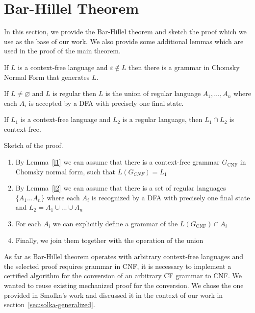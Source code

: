 \section{Bar-Hillel Theorem}
\label{sec:b-h-th}

In this section, we provide the Bar-Hillel theorem and sketch the proof which we use as the base of our work.
We also provide some additional lemmas which are used in the proof of the main theorem.

\begin{lemma} \label{l1}
	If $L$ is a context-free language and $\varepsilon \notin L$ then there is a grammar in Chomsky Normal Form that generates $L$.
\end{lemma}

\begin{lemma} \label{l2}
	If $ L \neq \varnothing $ and $L$ is regular then $L$ is the union of regular language $A_1, \ldots , A_n$ where each $A_i$ is accepted by a DFA with precisely one final state.
\end{lemma}

\begin{theorem}
	If $L_1$ is a context-free language and $L_2$ is a regular language, then $L_1 \cap L_2$ is context-free.
\end{theorem}


Sketch of the proof.
\begin{enumerate}
	\item By Lemma~\ref{l1} we can assume that there is a context-free grammar $G_{\text{CNF}}$ in Chomsky normal form, such that $L(G_{CNF}) = L_1$
	\item By Lemma~\ref{l2} we can assume that there is a set of regular languages $\{A_{1} \ldots A_n \}$ where each $A_i$ is recognized by a DFA with precisely one final state and $L_2 = A_1 \cup \ldots \cup A_n$
	\item For each $A_i$ we can explicitly define a grammar of the $L( G_{\text{CNF}} ) \cap A_i$
	\item Finally, we join them together with the operation of the union
\end{enumerate}

As far as Bar-Hillel theorem operates with arbitrary context-free languages and the selected proof requires grammar in CNF, it is necessary to implement a certified algorithm for the conversion of an arbitrary CF grammar to CNF.
We wanted to reuse existing mechanized proof for the conversion.
We chose the one provided in Smolka's work and discussed it in the context of our work in section~\ref{sec:solka-generalized}.
